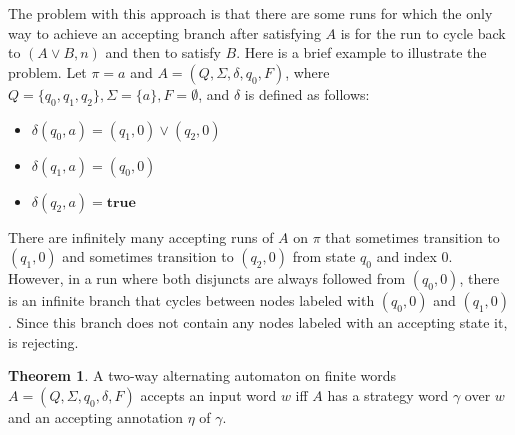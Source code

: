 \documentclass{lmcs}
\theoremstyle{definition}
\newtheorem{theorem}[thm]{Theorem}
\DeclareMathOperator{\?}{?}
\begin{document}
The problem with this approach is that there are some runs for which the only way to achieve an accepting
branch after satisfying $A$ is for the run to cycle back to $(A \vee B, n)$ and then to satisfy $B$.
Here is a brief example to illustrate the problem. Let $\pi = a$ and $A = (Q,\Sigma,\delta,q_0,F)$,
where $Q = \{ q_0, q_1, q_2  \}, \Sigma = \{ a \}, F = \emptyset$, and $\delta$ is defined
as follows:
\begin{itemize}
    \item $\delta(q_0,a) = (q_1,0) \vee (q_2,0)$
    \item $\delta(q_1,a) = (q_0,0)$
    \item $\delta(q_2,a) = \textbf{true}$
\end{itemize}

There are infinitely many accepting runs of $A$ on $\pi$ that sometimes transition to
$(q_1,0)$ and sometimes transition to $(q_2,0)$ from state $q_0$
and index 0. However, in a run where both disjuncts are always followed from $(q_0,0)$, there is an infinite
branch that cycles between nodes labeled with $(q_0,0)$ and $(q_1,0)$. Since this branch does not contain any nodes labeled
with an accepting state it, is rejecting.




\begin{theorem}
    A two-way alternating automaton on finite words $A = (Q,\Sigma,q_0,\delta,F)$ accepts an input word $w$ iff $A$ has a strategy word $\gamma$ over $w$ and
    an accepting annotation $\eta$ of $\gamma$.
\end{theorem}
\end{document}

